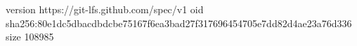 version https://git-lfs.github.com/spec/v1
oid sha256:80e1dc5dbacdbdcbe75167f6ea3bad27f317696454705e7dd82d4ae23a76d336
size 108985
